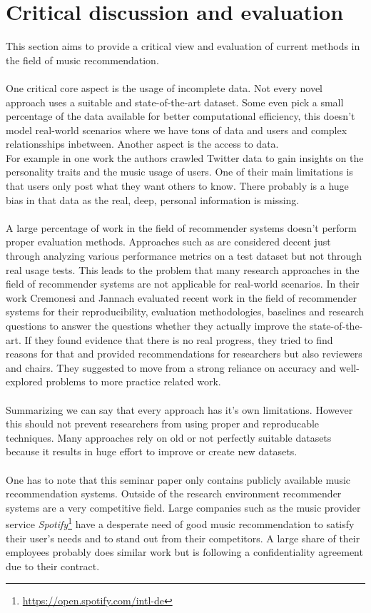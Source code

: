 \documentclass[runningheads,a4paper]{llncs}
\begin{document}
\section{Critical discussion and evaluation}
This section aims to provide a critical view and evaluation of current methods in the field of music recommendation. \\
\\
One critical core aspect is the usage of incomplete data. Not every novel approach uses a suitable and state-of-the-art dataset.
Some even pick a small percentage of the data available for better computational efficiency, this doesn't model real-world scenarios where we have tons of data and users and complex relationsships inbetween. 
Another aspect is the access to data. \\
For example in one work  \cite{melchiorre2020personality}  the authors crawled Twitter data
 to gain insights on the personality traits and the music usage of users. 
One of their main limitations is that users only post what they want others to know. There probably is a huge bias in that data as the real, deep, personal information is missing. \\
\\
A large percentage of work in the field of recommender systems doesn't perform proper evaluation methods. 
Approaches such as \cite{niyazov2021content} are considered decent just through analyzing various performance metrics on a test dataset but not 
through real usage tests. This leads to the problem that many research approaches in the field of recommender systems are 
not applicable for real-world scenarios. 
In their work Cremonesi and Jannach evaluated recent work in the field of recommender systems for their reproducibility, 
evaluation methodologies, baselines and research questions to answer the questions whether they actually improve the state-of-the-art.
If they found evidence that there is no real progress, they tried to find reasons for that and provided recommendations for researchers 
but also reviewers and chairs. 
They suggested to move from a strong reliance on accuracy and well-explored problems to more practice related work. \cite{cremonesi2021progress} \\
\\
Summarizing we can say that every approach has it's own limitations. However this should not prevent researchers from using proper and reproducable techniques. 
Many approaches rely on old or not perfectly suitable datasets because 
it results in huge effort to improve or create new datasets. \\
\\
One has to note that this seminar paper only contains publicly available music recommendation systems.
Outside of the research environment recommender systems are a very competitive field. 
Large companies such as the music provider service \textit{Spotify}\footnote{\url{https://open.spotify.com/intl-de}}
have a desperate need of good music recommendation to satisfy their user's needs and to stand out from their competitors. 
A large share of their employees probably does similar work but 
is following a confidentiality agreement due to their contract.\\
\end{document}
